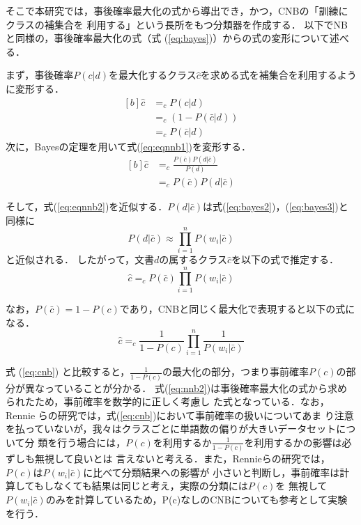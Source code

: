 \documentclass[japanese]{jnlp_1.4}
\newcommand{\argmax}{}
\newcommand{\argmin}{}
\begin{document}
そこで本研究では，事後確率最大化の式から導出でき，かつ，CNBの「訓練にクラスの補集合を
利用する」という長所をもつ分類器を作成する．
以下でNBと同様の，事後確率最大化の式（式
(\ref{eq:bayes})）からの式の変形について述べる．

まず，事後確率$P(c|d)$を最大化するクラス$\hat{c}$を求める式を補集合を利用するように変形する．
\begin{equation}
\begin{aligned}[b]
\hat{c}  & = \argmax_{c} P(c|d) \\
  & =  \argmax_{c} (1-P(\bar{c}|d)) \\
  & =  \argmin_{c} P(\bar{c}|d) 
\end{aligned}
\label{eq:eqnnb1}
\end{equation}
次に，Bayesの定理を用いて式(\ref{eq:eqnnb1})を変形する．
\begin{equation}
\begin{aligned}[b]
 \hat{c} & =  \argmin_{c} \frac{P(\bar{c})P(d|\bar{c})} {P(d)} \\
   & =  \argmin_{c} P(\bar{c})P(d|\bar{c}) 
\end{aligned}
\label{eq:eqnnb2}
\end{equation}

そして，式(\ref{eq:eqnnb2})を近似する．$P(d|\bar{c})$は式(\ref{eq:bayes2})，(\ref{eq:bayes3})と同様に
\begin{equation}
P(d|\bar{c})\approx\prod_{i=1}^{n} P(w_i|\bar{c}) \label{eq:eqnnb3}
\end{equation}
と近似される．
したがって，文書$d$の属するクラス$\hat{c}$を以下の式で推定する．
\begin{equation}
\hat{c} =\argmin_{c} P(\bar{c}) \prod_{i=1}^{n} P(w_i|\bar{c}) \label{eq:nnb}
\end{equation}

なお，$P(\bar{c})=1-P(c)$であり，CNBと同じく最大化で表現すると以下の式になる．
\begin{equation}
\hat{c} =\argmax_{c} \frac{1}{1-P(c)} \prod_{i=1}^{n} \frac{1}{P(w_i|\bar{c})} \label{eq:nnb2}
\end{equation}

式 (\ref{eq:cnb}) と比較すると，$\frac{1}{1-P(c)}$の最大化の部分，つまり事前確率$P(c)$の部分が異なっていることが分かる．
式(\ref{eq:nnb2})は事後確率最大化の式から求められたため，事前確率を数学的に正しく考慮し
た式となっている．なお，Rennie らの研究では，式(\ref{eq:cnb})において事前確率の扱いについてあま
り注意を払っていないが，我々はクラスごとに単語数の偏りが大きいデータセットについて分
類を行う場合には，$P(c)$を利用するか$\frac{1}{1-P(c)}$を利用するかの影響は必ずしも無視して良いとは
言えないと考える．また，Rennieらの研究では，$P(c)$は$P(w_i|\bar{c})$に比べて分類結果への影響が
小さいと判断し，事前確率は計算してもしなくても結果は同じと考え，実際の分類には$P(c)$を
無視して$P(w_i|\bar{c})$のみを計算しているため，P(c)なしのCNBについても参考として実験を行う．
\end{document}
